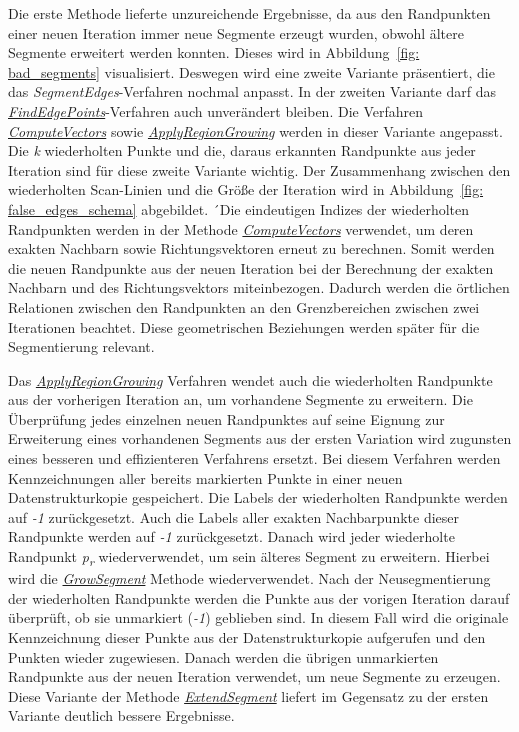 Die erste Methode lieferte unzureichende Ergebnisse, da aus den Randpunkten einer neuen Iteration immer neue Segmente erzeugt wurden, obwohl ältere Segmente erweitert werden konnten. Dieses wird in Abbildung~\ref{fig: bad_segments} visualisiert. Deswegen wird eine zweite Variante präsentiert, die das \textit{SegmentEdges}-Verfahren nochmal anpasst. In der zweiten Variante darf das \textit{\hyperref[alg:find_edge_points]{FindEdgePoints}}-Verfahren auch unverändert bleiben. Die Verfahren \textit{\hyperref[alg:compute_vectors]{ComputeVectors}} sowie \textit{\hyperref[alg:apply_region_growing]{ApplyRegionGrowing}} werden in dieser Variante angepasst. Die \textit{k} wiederholten Punkte und die, daraus erkannten Randpunkte aus jeder Iteration sind für diese zweite Variante wichtig. Der Zusammenhang zwischen den wiederholten Scan-Linien und die Größe der Iteration wird in Abbildung~\ref{fig: false_edges_schema} abgebildet. ´Die eindeutigen Indizes der wiederholten Randpunkten werden in der Methode \textit{\hyperref[alg:compute_vectors]{ComputeVectors}} verwendet, um deren exakten Nachbarn sowie Richtungsvektoren erneut zu berechnen. Somit werden die neuen Randpunkte aus der neuen Iteration bei der Berechnung der exakten Nachbarn und des Richtungsvektors miteinbezogen. Dadurch werden die örtlichen Relationen zwischen den Randpunkten an den Grenzbereichen zwischen zwei Iterationen beachtet. Diese geometrischen Beziehungen werden später für die Segmentierung relevant.

Das \textit{\hyperref[alg:apply_region_growing]{ApplyRegionGrowing}} Verfahren wendet auch die wiederholten Randpunkte aus der vorherigen Iteration an, um vorhandene Segmente zu erweitern. Die Überprüfung jedes einzelnen neuen Randpunktes auf seine Eignung zur Erweiterung eines vorhandenen Segments aus der ersten Variation wird zugunsten eines besseren und effizienteren Verfahrens ersetzt. Bei diesem Verfahren werden Kennzeichnungen aller bereits markierten Punkte in einer neuen Datenstrukturkopie gespeichert. Die Labels der wiederholten Randpunkte werden auf \textit{-1} zurückgesetzt. Auch die Labels aller exakten Nachbarpunkte dieser Randpunkte werden auf \textit{-1} zurückgesetzt. Danach wird jeder wiederholte Randpunkt \textit{p\textsubscript{r}} wiederverwendet, um sein älteres Segment zu erweitern. Hierbei wird die \textit{\hyperref[alg:grow_segment]{GrowSegment}} Methode wiederverwendet. Nach der Neusegmentierung der wiederholten Randpunkte werden die Punkte aus der vorigen Iteration darauf überprüft, ob sie unmarkiert (\textit{-1}) geblieben sind. In diesem Fall wird die originale Kennzeichnung dieser Punkte aus der Datenstrukturkopie aufgerufen und den Punkten wieder zugewiesen. Danach werden die übrigen unmarkierten Randpunkte aus der neuen Iteration verwendet, um neue Segmente zu erzeugen. Diese Variante der Methode \textit{\hyperref[alg: extend_segments]{ExtendSegment}} liefert im Gegensatz zu der ersten Variante deutlich bessere Ergebnisse.

